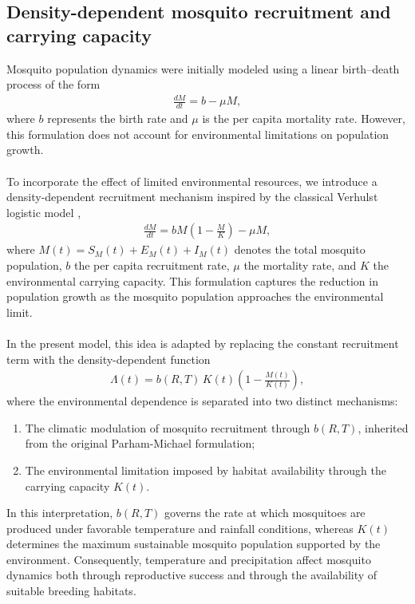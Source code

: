 \documentclass[a4paper,fleqn]{cas-dc}
\begin{document}
\subsection{Density-dependent mosquito recruitment and carrying capacity}
\label{sec:density_dependent_recruitment_carrying_capacity}
Mosquito population dynamics were initially modeled using a linear birth–death process of the form
\begin{align}
\frac{dM}{dt} = b - \mu M,
\end{align}
where $b$ represents the birth rate and $\mu$ is the per capita mortality rate. 
However, this formulation does not account for environmental limitations on population growth.
\\\\
To incorporate the effect of limited environmental resources, we introduce a density-dependent recruitment mechanism inspired by the classical Verhulst logistic model \cite{math_assessment_of_the_role_of_temp_and_rainfall},
\begin{align}
\frac{dM}{dt} = bM\left(1 - \frac{M}{K}\right) - \mu M,
\end{align}
where $M(t)=S_M(t)+E_M(t)+I_M(t)$ denotes the total mosquito population, $b$ the per capita recruitment rate, $\mu$ the mortality rate, and $K$ the environmental carrying capacity. This formulation captures the reduction in population growth as the mosquito population approaches the environmental limit.
\\\\
In the present model, this idea is adapted by replacing the constant recruitment term with the density-dependent function
\begin{align}
\Lambda(t) = b(R,T)\,K(t)\left(1 - \frac{M(t)}{K(t)}\right),
\label{eq:density_dependent_function}
\end{align}
where the environmental dependence is separated into two distinct mechanisms:
\begin{enumerate}
\item The climatic modulation of mosquito recruitment through $b(R,T)$, inherited from the original Parham-Michael formulation;
\item The environmental limitation imposed by habitat availability through the carrying capacity $K(t)$.
\end{enumerate}
In this interpretation, $b(R,T)$ governs the rate at which mosquitoes are produced under favorable temperature and rainfall conditions, whereas $K(t)$ determines the maximum sustainable mosquito population supported by the environment. Consequently, temperature and precipitation affect mosquito dynamics both through reproductive success and through the availability of suitable breeding habitats.
\end{document}
